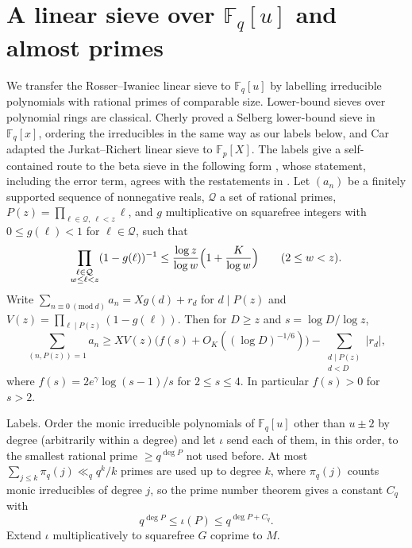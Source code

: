 \documentclass[11pt]{amsart}
\theoremstyle{definition}
\newcommand{\F}{\mathbb{F}}
\begin{document}
\section{A linear sieve over $\F_q[u]$ and almost primes}

We transfer the Rosser--Iwaniec linear sieve to $\F_q[u]$ by labelling irreducible polynomials with rational primes of comparable size. Lower-bound sieves over polynomial rings are classical. Cherly \cite{Cherly} proved a Selberg lower-bound sieve in $\F_q[x]$, ordering the irreducibles in the same way as our labels below, and Car \cite{Car} adapted the Jurkat--Richert linear sieve to $\F_p[X]$. The labels give a self-contained route to the beta sieve in the following form \cite[Theorem 11.13]{FI}, whose statement, including the error term, agrees with the restatements in \cite{KLR,BanksFreiberg}. Let $(a_n)$ be a finitely supported sequence of nonnegative reals, $\mathcal Q$ a set of rational primes, $P(z)=\prod_{\ell\in\mathcal Q,\ \ell<z}\ell$, and $g$ multiplicative on squarefree integers with $0\le g(\ell)<1$ for $\ell\in\mathcal Q$, such that
\begin{equation}\label{eq:dim}
\prod_{\substack{\ell\in\mathcal Q\\ w\le\ell<z}}(1-g(\ell))^{-1}\le\frac{\log z}{\log w}\Bigl(1+\frac{K}{\log w}\Bigr)\qquad(2\le w<z).
\end{equation}
Write $\sum_{n\equiv0\ (\mathrm{mod}\ d)}a_n=Xg(d)+r_d$ for $d\mid P(z)$ and $V(z)=\prod_{\ell\mid P(z)}(1-g(\ell))$. Then for $D\ge z$ and $s=\log D/\log z$,
\begin{equation}\label{eq:lower}
\sum_{(n,P(z))=1}a_n\ge XV(z)\bigl(f(s)+O_K((\log D)^{-1/6})\bigr)-\sum_{\substack{d\mid P(z)\\ d<D}}|r_d|,
\end{equation}
where $f(s)=2e^\gamma\log(s-1)/s$ for $2\le s\le4$. In particular $f(s)>0$ for $s>2$.

Labels. Order the monic irreducible polynomials of $\F_q[u]$ other than $u\pm2$ by degree (arbitrarily within a degree) and let $\iota$ send each of them, in this order, to the smallest rational prime $\ge q^{\deg P}$ not used before. At most $\sum_{j\le k}\pi_q(j)\ll_qq^k/k$ primes are used up to degree $k$, where $\pi_q(j)$ counts monic irreducibles of degree $j$, so the prime number theorem gives a constant $C_q$ with
\begin{equation}\label{eq:iota}
q^{\deg P}\le\iota(P)\le q^{\deg P+C_q}.
\end{equation}
Extend $\iota$ multiplicatively to squarefree $G$ coprime to $M$.
\end{document}

